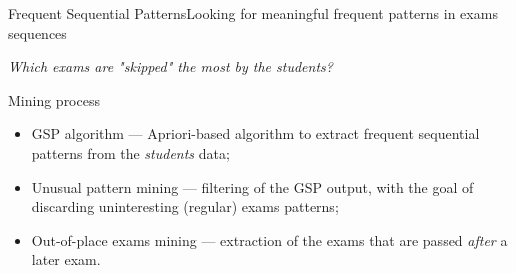 \begin{frame}{Frequent Sequential Patterns}{Looking for meaningful frequent patterns in exams sequences}

    \centering\textit{Which exams are "skipped" the most by the students?} \vspace{0,3cm}

\begin{block}{Mining process}
		\begin{itemize}
			\item<1-> \alert{GSP algorithm} --- Apriori-based algorithm to extract frequent sequential patterns from the \emph{students} data;
			\item<2-> \alert{Unusual pattern mining} --- filtering of the GSP output, with the goal of discarding uninteresting (regular) exams patterns;
			\item<3-> \alert{Out-of-place exams mining} --- extraction of the exams that are passed \emph{after} a later exam.
		\end{itemize}
	\end{block}

\end{frame}

